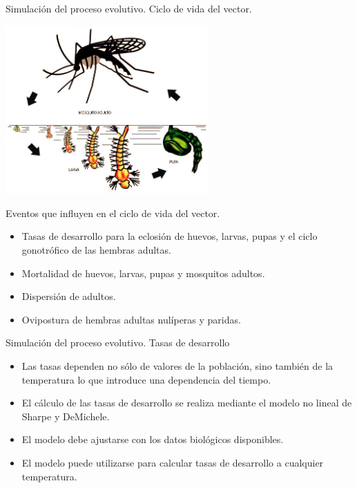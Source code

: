
\begin{frame}[c]{Simulación del proceso evolutivo. Ciclo de vida del vector.}
  \begin{center}
      \includegraphics[width=7.8cm]{./graphics/ciclo-de-vida.jpg}
  \end{center}
\end{frame}


\begin{frame}[c]{Eventos que influyen en el ciclo de vida del vector.}
  \begin{itemize}
    \item Tasas de desarrollo para la eclosión de huevos, larvas, pupas y el ciclo gonotrófico de las hembras adultas.
    \item Mortalidad de huevos, larvas, pupas y mosquitos adultos.
    \item Dispersión de adultos.
    \item Ovipostura de hembras adultas nulíperas y paridas.
  \end{itemize}
\end{frame}

\begin{frame}[c]{Simulación del proceso evolutivo. Tasas de desarrollo}
  \begin{itemize}

    \item Las tasas dependen no sólo de valores de la población, sino también de la temperatura lo que introduce una dependencia del tiempo.

    \item El cálculo de las tasas de desarrollo se realiza mediante el modelo no lineal de Sharpe y DeMichele.

    \item El modelo debe ajustarse con los datos biológicos disponibles.
    \item El modelo puede utilizarse para calcular tasas de desarrollo a cualquier temperatura.
  \end{itemize}
\end{frame}


